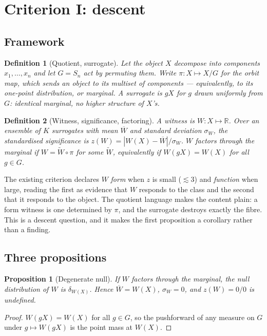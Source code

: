 \documentclass[11pt]{article}
\newtheorem{proposition}{Proposition}
\newtheorem{definition}{Definition}
\theoremstyle{remark}
\begin{document}
\section{Criterion I: descent}\label{sec:descent}

\subsection{Framework}

\begin{definition}[Quotient, surrogate]
Let the object $X$ decompose into components $x_1,\dots,x_n$ and let $G=S_n$ act by
permuting them. Write $\pi\colon X\mapsto X/G$ for the orbit map, which sends an object
to its multiset of components --- equivalently, to its one-point distribution, or
\emph{marginal}. A \emph{surrogate} is $gX$ for $g$ drawn uniformly from $G$: identical
marginal, no higher structure of $X$'s.
\end{definition}

\begin{definition}[Witness, significance, factoring]
A \emph{witness} is $W\colon X\mapsto\mathbb{R}$. Over an ensemble of $K$ surrogates
with mean $\overline{W}$ and standard deviation $\sigma_W$, the \emph{standardised
significance} is $z(W)=|W(X)-\overline{W}|/\sigma_W$. $W$ \emph{factors through the
marginal} if $W=\widetilde{W}\circ\pi$ for some $\widetilde{W}$, equivalently if
$W(gX)=W(X)$ for all $g\in G$.
\end{definition}

The existing criterion \cite{ff06e} declares $W$ \emph{form} when $z$ is small
($\lesssim3$) and \emph{function} when large, reading the first as evidence that $W$
responds to the class and the second that it responds to the object. The quotient
language makes the content plain: a form witness is one determined by $\pi$, and the
surrogate destroys exactly the fibre. This is a descent question, and it makes the first
proposition a corollary rather than a finding.

\subsection{Three propositions}

\begin{proposition}[Degenerate null]\label{prop:degenerate}
If $W$ factors through the marginal, the null distribution of $W$ is $\delta_{W(X)}$.
Hence $\overline{W}=W(X)$, $\sigma_W=0$, and $z(W)=0/0$ is undefined.
\end{proposition}
\begin{proof}
$W(gX)=W(X)$ for all $g\in G$, so the pushforward of any measure on $G$ under
$g\mapsto W(gX)$ is the point mass at $W(X)$.
\end{proof}
\end{document}
